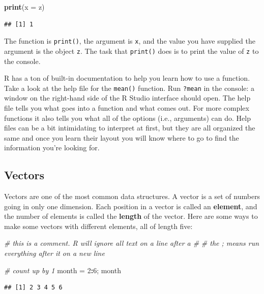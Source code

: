 \documentclass[]{book}
\newenvironment{Shaded}{\begin{snugshade}}{\end{snugshade}}
\newcommand{\KeywordTok}[1]{\textcolor[rgb]{0.13,0.29,0.53}{\textbf{#1}}}
\newcommand{\DataTypeTok}[1]{\textcolor[rgb]{0.13,0.29,0.53}{#1}}
\newcommand{\DecValTok}[1]{\textcolor[rgb]{0.00,0.00,0.81}{#1}}
\newcommand{\StringTok}[1]{\textcolor[rgb]{0.31,0.60,0.02}{#1}}
\newcommand{\CommentTok}[1]{\textcolor[rgb]{0.56,0.35,0.01}{\textit{#1}}}
\newcommand{\OperatorTok}[1]{\textcolor[rgb]{0.81,0.36,0.00}{\textbf{#1}}}
\newcommand{\NormalTok}[1]{#1}
\theoremstyle{definition}
\theoremstyle{definition}
\theoremstyle{definition}
\theoremstyle{remark}
\begin{document}
\begin{Shaded}
\begin{Highlighting}[]
\KeywordTok{print}\NormalTok{(}\DataTypeTok{x =}\NormalTok{ z)}
\end{Highlighting}
\end{Shaded}

\begin{verbatim}
## [1] 1
\end{verbatim}

The function is \texttt{print()}, the argument is \texttt{x}, and the
value you have supplied the argument is the object \texttt{z}. The task
that \texttt{print()} does is to print the value of \texttt{z} to the
console.

R has a ton of built-in documentation to help you learn how to use a
function. Take a look at the help file for the \texttt{mean()} function.
Run \texttt{?mean} in the console: a window on the right-hand side of
the R Studio interface should open. The help file tells you what goes
into a function and what comes out. For more complex functions it also
tells you what all of the options (i.e., arguments) can do. Help files
can be a bit intimidating to interpret at first, but they are all
organized the same and once you learn their layout you will know where
to go to find the information you're looking for.

\subsection{Vectors}\label{vectors}

Vectors are one of the most common data structures. A vector is a set of
numbers going in only one dimension. Each position in a vector is called
an \textbf{element}, and the number of elements is called the
\textbf{length} of the vector. Here are some ways to make some vectors
with different elements, all of length five:

\begin{Shaded}
\begin{Highlighting}[]
\CommentTok{# this is a comment. R will ignore all text on a line after a #}
\CommentTok{# the ; means run everything after it on a new line}

\CommentTok{# count up by 1}
\NormalTok{month =}\StringTok{ }\DecValTok{2}\OperatorTok{:}\DecValTok{6}\NormalTok{; month}
\end{Highlighting}
\end{Shaded}

\begin{verbatim}
## [1] 2 3 4 5 6
\end{verbatim}
\end{document}
